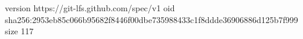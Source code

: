 version https://git-lfs.github.com/spec/v1
oid sha256:2953eb85c066b95682f8446f00dbe735988433c1f8ddde36906886d125b7f999
size 117
